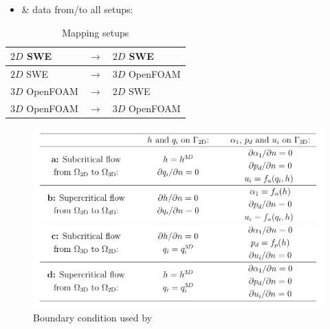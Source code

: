 
\begin{frame}
\begin{itemize}
 \item {} \&  data from/to all setups:
 \end{itemize}
  \vspace{0.4cm}
\begin{table}[]
\begin{tabular}{|lll|}\hline
$2D$ SWE       & $\rightarrow$ & $2D$ SWE       \\ \hline
$2D$ SWE       & $\rightarrow$ & $3D$ OpenFOAM \\ \hline
$3D$ OpenFOAM & $\rightarrow$ & $2D$ SWE       \\ \hline
$3D$ OpenFOAM & $\rightarrow$ & $3D$ OpenFOAM \\ \hline
\end{tabular}
\caption{Mapping setups}
\label{table:1}
\end{table}
\end{frame}


\begin{frame}
\begin{figure}
\includegraphics[scale=0.44]{./Resources/Images/bcs_mintgen.png}
\caption{Boundary condition used by \cite{mintgen}}
\end{figure}
\end{frame}

